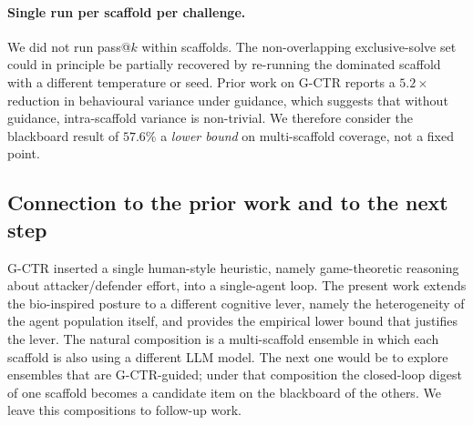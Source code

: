 \paragraph{Single run per scaffold per challenge.} We did not run pass@$k$ within scaffolds. The non-overlapping exclusive-solve set could in principle be partially recovered by re-running the dominated scaffold with a different temperature or seed. Prior work on G-CTR \cite{mayoralvilches2025gametheoretic} reports a $5.2\times$ reduction in behavioural variance under guidance, which suggests that without guidance, intra-scaffold variance is non-trivial. We therefore consider the blackboard result of $57.6\%$ a \emph{lower bound} on multi-scaffold coverage, not a fixed point.



\subsection{Connection to the prior work and to the next step}\label{sec:connection}

G-CTR \cite{mayoralvilches2025gametheoretic} inserted a single human-style heuristic, namely game-theoretic reasoning about attacker/defender effort, into a single-agent loop. The present work extends the bio-inspired posture to a different cognitive lever, namely the heterogeneity of the agent population itself, and provides the empirical lower bound that justifies the lever. The natural composition is a multi-scaffold ensemble in which each scaffold is also using a different LLM model. The next one would be to explore ensembles that are G-CTR-guided; under that composition the closed-loop digest of one scaffold becomes a candidate item on the blackboard of the others. We leave this compositions to follow-up work.
